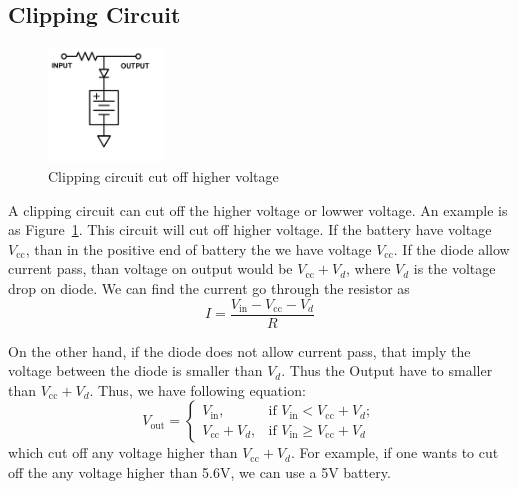 \documentclass[aps,prl,reprint]{revtex4-1}
\newcommand{\vcc}{V_\text{cc}}
\begin{document}
    \subsection{Clipping Circuit}
    \begin{figure}[h]
        \centering
        \includegraphics[height=1.2in]{image/Clipping-Circuit.pdf}
        \caption{Clipping circuit cut off higher voltage}
        \label{fig:clippingCircuit}
    \end{figure}
    A clipping circuit can cut off the higher voltage or lowwer voltage. An example is as Figure~\ref{fig:clippingCircuit}. This circuit will cut off higher voltage. If the battery have voltage $\vcc$, than in the positive end of battery the we have voltage $\vcc$. If the diode allow current pass, than voltage on output would be $\vcc + V_d$, where $V_d$ is the voltage drop on diode. We can find the current go through the resistor as 
    \[
    I = \frac{V_\text{in} - \vcc - V_d }{R}
    \]

    On the other hand, if the diode does not allow current pass, that imply the voltage between the diode is smaller than $V_d$. Thus the Output have to smaller than $\vcc + V_d$. Thus, we have following equation:
    \begin{equation}
        V_\text{out} = 
        \begin{cases}
            V_\text{in},    &\text{if } V_\text{in}<\vcc + V_d;\\
            \vcc + V_d,     &\text{if } V_\text{in}\ge\vcc + V_d
        \end{cases} \label{eq:clippingCircuit}
    \end{equation}
    which cut off any voltage higher than $\vcc + V_d$. For example, if one wants to cut off the any voltage higher than 5.6V, we can use a 5V battery.
\end{document}
